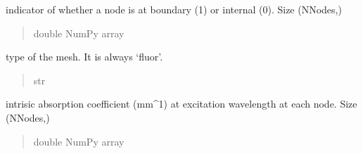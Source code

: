 \documentclass[letterpaper,10pt,english]{sphinxmanual}
\begin{document}
\begin{fulllineitems}

\begin{fulllineitems}
\label{\detokenize{_autosummary/nirfasterff.base.fluor_mesh.fluormesh:nirfasterff.base.fluor_mesh.fluormesh.bndvtx}}
\pysigstartsignatures
{}
\pysigstopsignatures
\sphinxAtStartPar
indicator of whether a node is at boundary (1) or internal (0). Size (NNodes,)
\begin{quote}\begin{description}
\sphinxAtStartPar
double NumPy array

\end{description}\end{quote}

\end{fulllineitems}


\begin{fulllineitems}
\label{\detokenize{_autosummary/nirfasterff.base.fluor_mesh.fluormesh:nirfasterff.base.fluor_mesh.fluormesh.type}}
\pysigstartsignatures
{}
\pysigstopsignatures
\sphinxAtStartPar
type of the mesh. It is always ‘fluor’.
\begin{quote}\begin{description}
\sphinxAtStartPar
str

\end{description}\end{quote}

\end{fulllineitems}


\begin{fulllineitems}
\label{\detokenize{_autosummary/nirfasterff.base.fluor_mesh.fluormesh:nirfasterff.base.fluor_mesh.fluormesh.muax}}
\pysigstartsignatures
{}
\pysigstopsignatures
\sphinxAtStartPar
intrisic absorption coefficient (mm\textasciicircum{}\sphinxhyphen{}1) at excitation wavelength at each node. Size (NNodes,)
\begin{quote}\begin{description}
\sphinxAtStartPar
double NumPy array


\end{description}
\end{quote}
\end{fulllineitems}
\end{fulllineitems}
\end{document}
